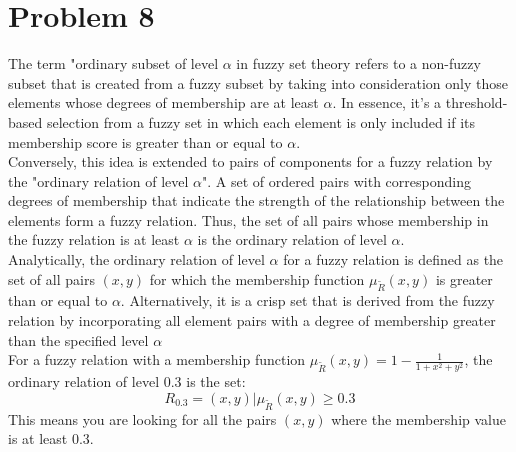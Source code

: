 \section{Problem 8}
The term "ordinary subset of level $\alpha$ in fuzzy set theory refers to a non-fuzzy subset that is created from a fuzzy subset by taking into consideration only those elements whose degrees of membership are at least $\alpha$. In essence, it's a threshold-based selection from a fuzzy set in which each element is only included if its membership score is greater than or equal to $\alpha$.\\
Conversely, this idea is extended to pairs of components for a fuzzy relation by the "ordinary relation of level $\alpha$". A set of ordered pairs with corresponding degrees of membership that indicate the strength of the relationship between the elements form a fuzzy relation. Thus, the set of all pairs whose membership in the fuzzy relation is at least $\alpha$ is the ordinary relation of level $\alpha$. \\

Analytically, the ordinary relation of level $\alpha$ for a fuzzy relation is defined as the set of all pairs $(x,y)$ for which the membership function $\mu_{\tilde{R}}(x,y)$ is greater than or equal to $\alpha$. Alternatively, it is a crisp set that is derived from the fuzzy relation by incorporating all element pairs with a degree of membership greater than the specified level $\alpha$\\

For a fuzzy relation with a membership function $\mu_{\tilde{R}}(x,y) = 1 - \frac{1}{1+x^2+y^2}$, the ordinary relation of level $0.3$ is the set:\\
\begin{equation}
	R_{0.3} = {(x,y) | \mu_{\tilde{R}}(x,y) \geq 0.3}
\end{equation}
This means you are looking for all the pairs $(x,y)$ where the membership value is at least $0.3$.\\

